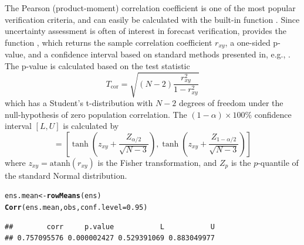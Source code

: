\documentclass[article]{jss}\usepackage{graphicx, color}
\makeatletter
\newcommand{\hlfunctioncall}[1]{\textcolor[rgb]{0,0.501960784313725,0.752941176470588}{\textbf{#1}}}%
\newenvironment{kframe}{%
 \def\at@end@of@kframe{}%
 \ifinner\ifhmode%
  \def\at@end@of@kframe{\end{minipage}}%
  \begin{minipage}{\columnwidth}%
 \fi\fi%
 \def\FrameCommand##1{\hskip\@totalleftmargin \hskip-\fboxsep
 \colorbox{shadecolor}{##1}\hskip-\fboxsep
     \hskip-\linewidth \hskip-\@totalleftmargin \hskip\columnwidth}%
 \MakeFramed {\advance\hsize-\width
   \@totalleftmargin\z@ \linewidth\hsize
   \@setminipage}}%
 {\par\unskip\endMakeFramed%
 \at@end@of@kframe}
\newenvironment{knitrout}{}{} %
\newcommand{\atanh}{\text{atanh}}
\makeatother
\begin{document}
The Pearson (product-moment) correlation coefficient is one of the most popular verification criteria, and can easily be calculated with the built-in  function .
Since uncertainty assessment is often of interest in forecast verification,  provides the function , which returns the sample correlation coefficient $r_{xy}$, a one-sided p-value, and a confidence interval based on standard methods presented in, e.g., \citet{vonstorch2001statistical}.
The p-value is calculated based on the test statistic
%
\begin{equation}
T_{\text{cor}} = \sqrt{(N-2) \frac{r_{xy}^2}{1 - r_{xy}^2}}
\end{equation}
%
which has a Student's t-distribution with $N-2$ degrees of freedom under the null-hypothesis of zero population correlation.
The $(1-\alpha)\times 100\%$ confidence interval $[L,U]$ is calculated by
%
\begin{equation}
[L, U] = \left[ \tanh\left(z_{xy} + \frac{Z_{\alpha/2}}{\sqrt{N-3}}\right), \tanh\left(z_{xy} + \frac{Z_{1-\alpha/2}}{\sqrt{N-3}}\right)\right]\label{eq:fisherCi}
\end{equation} 
%
where $z_{xy} = \atanh(r_{xy})$ is the Fisher transformation, and $Z_p$ is the $p$-quantile of the standard Normal distribution.
%
\begin{knitrout}
\color{fgcolor}\begin{kframe}
\begin{alltt}
ens.mean <- \hlfunctioncall{rowMeans}(ens)
\hlfunctioncall{Corr}(ens.mean, obs, conf.level=0.95)
\end{alltt}
\begin{verbatim}
##        corr     p.value           L           U 
## 0.757095576 0.000002427 0.529391069 0.883049977
\end{verbatim}
\end{kframe}
\end{knitrout}
\end{document}
